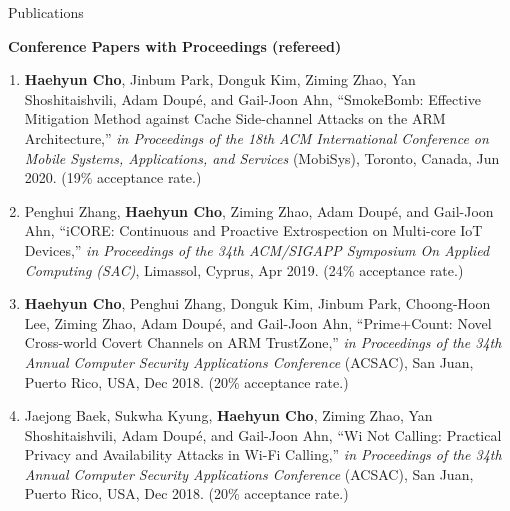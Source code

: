 \documentclass{resume} %
\makeatletter
\newlength{\bibhang}
\newlength{\bibsep}
{\@listi \global\bibsep\itemsep \global\advance\bibsep by\parsep}
\newenvironment{bibsection}%
{\begin{enumerate}{}{%
			\setlength{\leftmargin}{\bibhang}%
			\setlength{\itemindent}{-\leftmargin}%
			\setlength{\itemsep}{\bibsep}%
			\setlength{\parsep}{\z@}%
			\setlength{\partopsep}{0pt}%
			\setlength{\topsep}{0pt}}}
	{\end{enumerate}\vspace{-.6\baselineskip}}
\makeatother
\begin{document}

\begin{rSection}{\faGenderless~Publications}

    \strut\textbullet~{\bf Conference Papers with Proceedings (refereed)}
	\begin{bibsection}
        \item {\bf Haehyun Cho}, Jinbum Park, Donguk Kim, Ziming Zhao, Yan Shoshitaishvili, Adam Doup\'e, and Gail-Joon Ahn,
		``SmokeBomb: Effective Mitigation Method against Cache Side-channel Attacks on the ARM Architecture,'' 
        \emph{in Proceedings of the 18th ACM International Conference on Mobile Systems, Applications, and Services} (MobiSys), 
		Toronto, Canada, Jun 2020. (19\% acceptance rate.)

		\item Penghui Zhang, {\bf Haehyun Cho}, Ziming Zhao, Adam Doup\'e, and Gail-Joon Ahn,
		``iCORE: Continuous and Proactive Extrospection on Multi-core IoT Devices,'' 
        \emph{in Proceedings of the 34th ACM/SIGAPP Symposium On Applied Computing (SAC)}, 
		Limassol, Cyprus, Apr 2019. (24\% acceptance rate.)
     
        \item {\bf Haehyun Cho}, Penghui Zhang, Donguk Kim, Jinbum Park, Choong-Hoon Lee, Ziming Zhao, Adam Doup\'e, and Gail-Joon Ahn,
		``Prime+Count: Novel Cross-world Covert Channels on ARM TrustZone,'' 
        \emph{in Proceedings of the 34th Annual Computer Security Applications Conference} (ACSAC), 
		San Juan, Puerto Rico, USA, Dec 2018. (20\% acceptance rate.)

		\item Jaejong Baek, Sukwha Kyung, {\bf Haehyun Cho}, Ziming Zhao, Yan Shoshitaishvili, Adam Doup\'e, and Gail-Joon Ahn,
		``Wi Not Calling: Practical Privacy and Availability Attacks in Wi-Fi Calling,'' 
        \emph{in Proceedings of the 34th Annual Computer Security Applications Conference} (ACSAC), 
		San Juan, Puerto Rico, USA, Dec 2018. (20\% acceptance rate.)


\end{bibsection}
\end{rSection}
\end{document}
